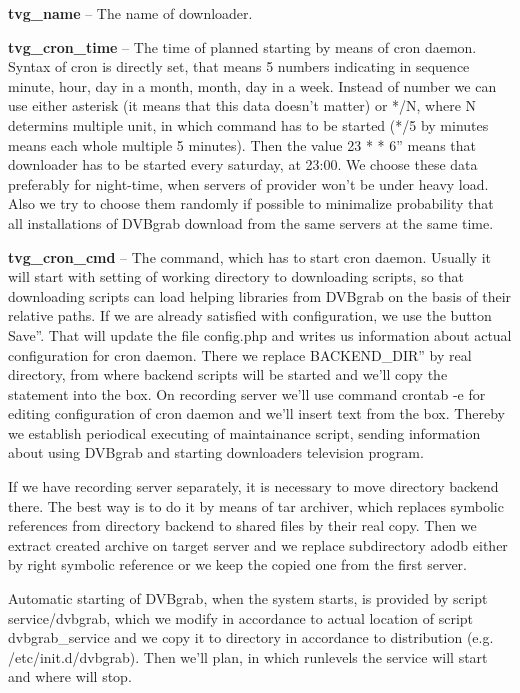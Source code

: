 \bitem
\item\textbf{tvg\_name} -- The name of downloader.
\item\textbf{tvg\_cron\_time} -- The time of planned starting by means of cron daemon. Syntax of cron is directly set, that means 5 numbers indicating in sequence minute, hour, day in a month, month, day in a week. Instead of number we can use either asterisk (it means that this data doesn't matter) or */N, where N determins multiple unit, in which command has to be started (*/5 by minutes means each whole multiple 5 minutes). Then the value  23 * * 6'' means that downloader has to be started every saturday, at 23:00. We choose these data preferably for night-time, when servers of provider won't be under heavy load. Also we try to choose them randomly if possible to minimalize probability that all installations of DVBgrab download from the same servers at the same time.
\item\textbf{tvg\_cron\_cmd} -- The command, which has to start cron daemon. Usually it will start with setting of working directory to downloading scripts, so that downloading scripts can load helping libraries from DVBgrab on the basis of their relative paths.
\eitem
If we are already satisfied with configuration, we use the button \quotedblbase Save''. That will update the file config.php and writes us information about actual configuration for cron daemon. There we replace \quotedblbase BACKEND\_DIR'' by real directory, from where backend scripts will be started and we'll copy the statement into the box. On recording server we'll use command crontab -e for editing configuration of cron daemon and we'll insert text from the box. Thereby we establish periodical executing of maintainance script, sending information about using DVBgrab and starting downloaders television program.

If we have recording server separately, it is necessary to move directory backend there. The best way is to do it by means of tar archiver, which replaces symbolic references from directory backend to shared files by their real copy. Then we extract created archive on target server and we replace subdirectory adodb either by right symbolic reference or we keep the copied one from the first server.

Automatic starting of DVBgrab, when the system starts, is provided by script service/dvbgrab, which we modify in accordance to actual location of script dvbgrab\_service and we copy it to directory in accordance to distribution (e.g. /etc/init.d/dvbgrab). Then we'll plan, in which runlevels the service will start and where will stop.


